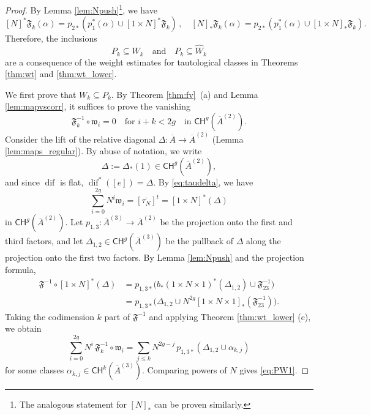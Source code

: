\documentclass[11pt]{article}
\def\CH{\mathsf{CH}}
\newcommand{\barA}{\overline{A}}
\newcommand{\diff}{\operatorname{dif}}
\theoremstyle{definition}
\begin{document}
\begin{proof}
	By Lemma \ref{lem:Npush}\footnote{The analogous statement for $[N]_{\ast}$ can be proven similarly.}, we have
    $$
    [N]^* \mathfrak F_k(\alpha) = p_{2*} (p_1^*(\alpha) \cup [1\times N]^* \mathfrak F_k)\, ,\quad [N]_* \mathfrak F_k(\alpha) = p_{2*} (p_1^*(\alpha) \cup [1\times N]_* \mathfrak F_k).
    $$
    Therefore, the inclusions
    $$
    P_k\subseteq W_k \quad\text{and}\quad P_k\subseteq\widehat{W}_k
    $$
    are a consequence of the weight estimates for tautological classes in Theorems \ref{thm:wt} and \ref{thm:wt_lower}.

    We first prove that $W_k \subseteq P_k$.
    By Theorem \ref{thm:fv}~(a) and Lemma \ref{lem:mapvscorr}, it suffices to prove the vanishing
    \begin{equation}\label{eq:PW1}
        \mathfrak F_k^{-1}\circ \mathfrak w_i =0 \quad \text{for } i+k<2g \quad \text{in } \CH^g(\barA^{(2)}).
    \end{equation}
	Consider the lift of the relative diagonal $\Delta : \barA \to \barA^{(2)}$ (Lemma \ref{lem:maps_regular}). By abuse of notation, we write
    \[
    \Delta := \Delta_*(1) \in \CH^g(\barA^{(2)}),
    \]
    and since $\diff$ is flat, $\diff^*([e]) = \Delta$. By \eqref{eq:taudelta}, we have
    \[
    \sum_{i=0}^{2g} N^i \mathfrak w_i
    =
    [\overline{\tau_N}]^t
    =
    [1\times N]^*(\Delta)
    \]
    in $\CH^g(\barA^{(2)})$.
    Let $p_{1,3} : \barA^{(3)} \to \barA^{(2)}$ be the projection onto the first and third factors, and let $\Delta_{1,2} \in \CH^g(\barA^{(3)})$ be the pullback of $\Delta$ along the projection onto the first two factors. By Lemma \ref{lem:Npush} and the projection formula,
    \begin{align*}
        \mathfrak F^{-1}\circ [1\times N]^*(\Delta)
        &=
        p_{1,3*}
        \bigl(
            b_*(1\times N \times 1)^*(\Delta_{1,2})
            \cup \mathfrak F_{23}^{-1}
        \bigr) \\
        &=
        p_{1,3*}
        \bigl(
            \Delta_{1,2}
            \cup
            N^{2g}[1\times N \times 1]_*(\mathfrak F_{23}^{-1})
        \bigr).
    \end{align*}
    Taking the codimension $k$ part of $\mathfrak F^{-1}$ and applying Theorem \ref{thm:wt_lower} (c), we obtain
    \[
    \sum_{i=0}^{2g} N^i\, \mathfrak F_k^{-1}\circ\mathfrak w_i
    =
    \sum_{j \leq k} N^{2g-j} \,
    p_{1,3*}(\Delta_{1,2}\cup \alpha_{k,j})
    \]
    for some classes $\alpha_{k,j}\in \CH^k(\barA^{(3)})$. Comparing powers of $N$ gives \eqref{eq:PW1}.


\end{proof}
\end{document}
